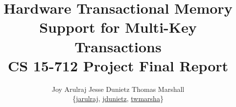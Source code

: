 \documentclass[pageno]{jpaper}
\makeatletter
\newcommand{\email}[1]{\href{mailto:#1@cs.cmu.edu}{#1}}
\makeatother
\begin{document}
\title{Hardware Transactional Memory Support for Multi-Key Transactions\\
\large{CS 15-712 Project Final Report}}

\author{Joy Arulraj \hspace{0.1 in} Jesse Dunietz \hspace{0.1 in} Thomas Marshall\\ 
{\{\email{jarulraj}, \email{jdunietz}, \email{twmarsha}\}}}

\date{}
\maketitle











\end{document}
